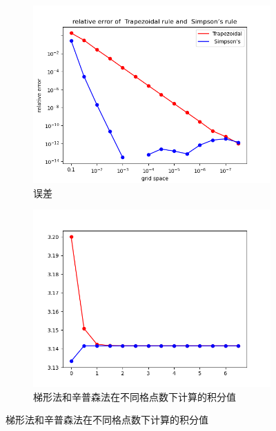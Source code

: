 \begin{figure}[tp]
    \centering
    \begin{subfigure}{0.45\linewidth}
        \includegraphics[width=\linewidth]{figures/IntErr.png} 
        \caption{误差}
    \end{subfigure}
    \begin{subfigure}{0.45\linewidth}
    \includegraphics[width=\linewidth]{figures/Int.png} 
    \caption{梯形法和辛普森法在不同格点数下计算的积分值}
    \end{subfigure}

\end{figure}

